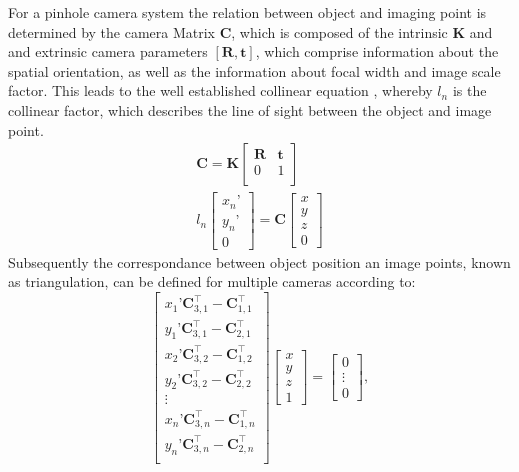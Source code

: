 \documentclass[5p,times,procedia]{elsarticle}
\begin{document}
For a pinhole camera system the relation between object and imaging point is determined by the camera Matrix $\mathbf{C}$, which is composed of the intrinsic $\mathbf{K}$ and  and extrinsic camera parameters $[\mathbf{R}, \mathbf{t}]$, which comprise information about the spatial orientation, as well as the information about focal width and
image scale factor. This leads to the well established collinear equation \cite{Luhmann2003}, whereby $l_n$ is the collinear factor, which describes the line of sight between the object and image point.
%
\begin{align}
	\mathbf{C} = \mathbf{K}
	\begin{bmatrix}
		\mathbf{R} & \mathbf{t} \\
		0 & 1 \\
	\end{bmatrix} \\
	l_{n}
	\begin{bmatrix}
		x_n’ \\
		y_n’ \\
		0
	\end{bmatrix}
	= \mathbf{C}
	\begin{bmatrix}
		x \\
		y \\
		z \\
		0
	\end{bmatrix}
\end{align}
Subsequently the correspondance between object position an image points, known as triangulation, can be defined for multiple cameras according to:
%
\begin{equation}
	\label{eqn:triangulation}
	\begin{bmatrix}
		x_{1}’ \mathbf{C}_{3,1}^{\top} - \mathbf{C}_{1,1}^{\top}\\
		y_{1}’ \mathbf{C}_{3,1}^{\top} - \mathbf{C}_{2,1}^{\top}\\
		x_{2}’ \mathbf{C}_{3,2}^{\top} - \mathbf{C}_{1,2}^{\top}\\
		y_{2}’ \mathbf{C}_{3,2}^{\top} - \mathbf{C}_{2,2}^{\top}\\
		\vdots \\
		x_{n}’ \mathbf{C}_{3,n}^{\top} - \mathbf{C}_{1,n}^{\top}\\
		y_{n}’ \mathbf{C}_{3,n}^{\top} - \mathbf{C}_{2,n}^{\top}\\
	\end{bmatrix}
	\begin{bmatrix}
		x \\
		y \\
		z \\
		1
	\end{bmatrix}
	=
	\begin{bmatrix}
		0 \\
		\vdots \\
		0
	\end{bmatrix},
\end{equation}
\end{document}
